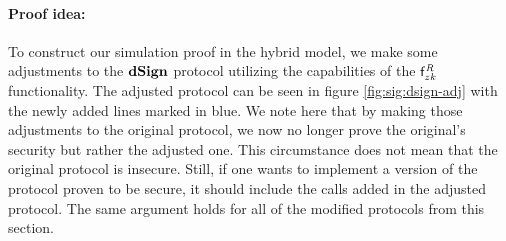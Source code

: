 \paragraph{Proof idea:} To construct our simulation proof in the hybrid model, we make some adjustments to the $\mathbf{dSign}$ protocol utilizing the capabilities of the $\mathsf{f}^{\mathit{R}}_{zk}$ functionality.
The adjusted protocol can be seen in figure \cref{fig:sig:dsign-adj} with the newly added lines marked in blue.
We note here that by making those adjustments to the original protocol, we now no longer prove the original's security but rather the adjusted one.
This circumstance does not mean that the original protocol is insecure.
Still, if one wants to implement a version of the protocol proven to be secure, it should include the calls added in the adjusted protocol.
The same argument holds for all of the modified protocols from this section.

